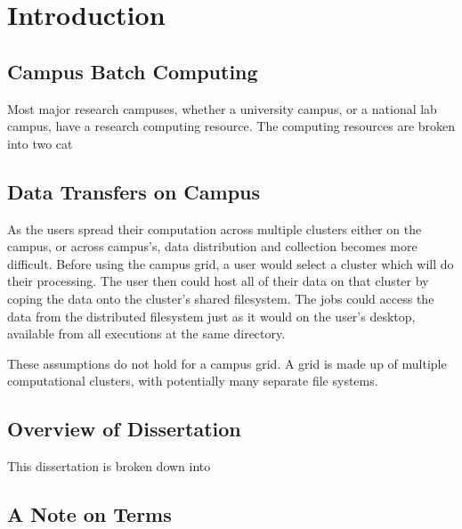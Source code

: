 \chapter{Introduction}

\section{Campus Batch Computing}

Most major research campuses, whether a university campus, or a national lab campus, have a research computing resource.  The computing resources are broken into two cat



\section{Data Transfers on Campus}

As the users spread their computation across multiple clusters either on the campus, or across campus's, data distribution and collection becomes more difficult.  Before using the campus grid, a user would select a cluster which will do their processing.  The user then could host all of their data on that cluster by coping the data onto the cluster's shared filesystem.  The jobs could access the data from the distributed filesystem just as it would on the user's desktop, available from all executions at the same directory.

These assumptions do not hold for a campus grid.  A grid is made up of multiple computational clusters, with potentially many separate file systems.    


\section{Overview of Dissertation}

This dissertation is broken down into 



\section{A Note on Terms}
